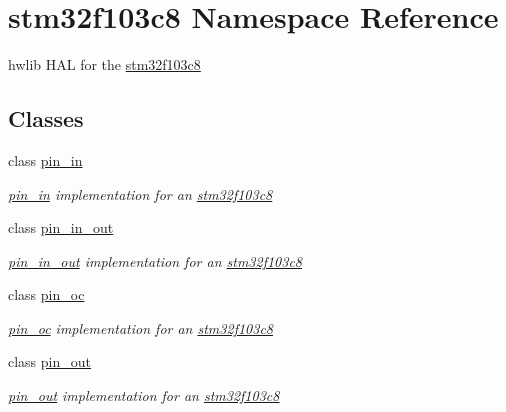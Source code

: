 \hypertarget{namespacestm32f103c8}{}\section{stm32f103c8 Namespace Reference}
\label{namespacestm32f103c8}


hwlib H\+AL for the \hyperlink{namespacestm32f103c8}{stm32f103c8}  


\subsection*{Classes}
\begin{DoxyCompactItemize}
\item 
class \hyperlink{classstm32f103c8_1_1pin__in}{pin\+\_\+in}
\begin{DoxyCompactList}\small\item\em \hyperlink{classstm32f103c8_1_1pin__in}{pin\+\_\+in} implementation for an \hyperlink{namespacestm32f103c8}{stm32f103c8} \end{DoxyCompactList}\item 
class \hyperlink{classstm32f103c8_1_1pin__in__out}{pin\+\_\+in\+\_\+out}
\begin{DoxyCompactList}\small\item\em \hyperlink{classstm32f103c8_1_1pin__in__out}{pin\+\_\+in\+\_\+out} implementation for an \hyperlink{namespacestm32f103c8}{stm32f103c8} \end{DoxyCompactList}\item 
class \hyperlink{classstm32f103c8_1_1pin__oc}{pin\+\_\+oc}
\begin{DoxyCompactList}\small\item\em \hyperlink{classstm32f103c8_1_1pin__oc}{pin\+\_\+oc} implementation for an \hyperlink{namespacestm32f103c8}{stm32f103c8} \end{DoxyCompactList}\item 
class \hyperlink{classstm32f103c8_1_1pin__out}{pin\+\_\+out}
\begin{DoxyCompactList}\small\item\em \hyperlink{classstm32f103c8_1_1pin__out}{pin\+\_\+out} implementation for an \hyperlink{namespacestm32f103c8}{stm32f103c8} \end{DoxyCompactList}\end{DoxyCompactItemize}
